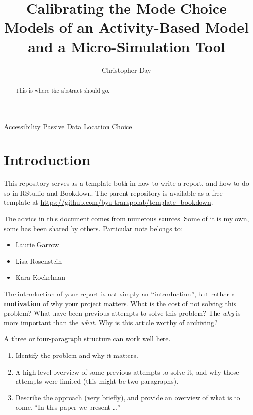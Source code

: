 \documentclass[3p, authoryear]{elsarticle} %
\providecommand{\tightlist}{%
  \setlength{\itemsep}{0pt}\setlength{\parskip}{0pt}}
\begin{document}
\begin{frontmatter}

  \title{Calibrating the Mode Choice Models of an Activity-Based Model and a Micro-Simulation Tool}
    \author[Brigham Young University]{Christopher Day}
      \address[Brigham Young University]{Civil and Environmental Engineering Department, 430 Engineering Building, Provo, Utah 84602}
  
  \begin{abstract}
  This is where the abstract should go.
  \end{abstract}
   \begin{keyword} Accessibility Passive Data Location Choice\end{keyword}
 \end{frontmatter}

\hypertarget{intro}{%
\section{Introduction}\label{intro}}

This repository serves as a template both in how to write a report, and how
to do so in RStudio and Bookdown. The parent repository is available as a free
template at \url{https://github.com/byu-transpolab/template_bookdown}.

The advice in this document comes from numerous sources. Some of it is my own, some
has been shared by others. Particular note belongs to:

\begin{itemize}
\tightlist
\item
  Laurie Garrow
\item
  Lisa Rosenstein
\item
  Kara Kockelman
\end{itemize}

The introduction of your report is not simply an ``introduction'', but rather a
\textbf{motivation} of why your project matters. What is the cost of not solving
this problem? What have been previous attempts to solve this problem? The \emph{why}
is more important than the \emph{what}. Why is this article worthy of archiving?

A three or four-paragraph structure can work well here.

\begin{enumerate}
\def\labelenumi{\arabic{enumi}.}
\tightlist
\item
  Identify the problem and why it matters.
\item
  A high-level overview of some previous attempts to solve it, and why those
  attempts were limited (this might be two paragraphs).
\item
  Describe the approach (very briefly), and provide an overview of what is
  to come. ``In this paper we present \ldots{}''
\end{enumerate}
\end{document}
